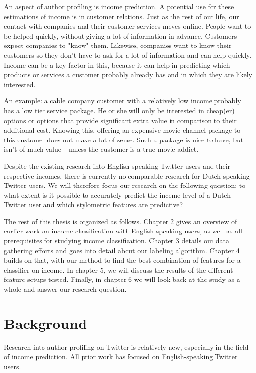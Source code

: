 \documentclass[
10pt, %
a4paper, %
oneside, %
headinclude,footinclude, %
] {book}%
\begin{document}
An aspect of author profiling is income prediction. A potential use for these estimations of income is in customer relations. Just as the rest of our life, our contact with companies and their customer services moves online. People want to be helped quickly, without giving a lot of information in advance. Customers expect companies to "know" them. Likewise, companies want to know their customers so they don't have to ask for a lot of information and can help quickly. Income can be a key factor in this, because it can help in predicting which products or services a customer probably already has and in which they are likely interested.

An example: a cable company customer with a relatively low income probably has a low tier service package. He or she will only be interested in cheap(er) options or options that provide significant extra value in comparison to their additional cost. Knowing this, offering an expensive movie channel package to this customer does not make a lot of sense. Such a package is nice to have, but isn't of much value - unless the customer is a true movie addict.


Despite the existing research into English speaking Twitter users and their respective incomes, there is currently no comparable research for Dutch speaking Twitter users. We will therefore focus our research on the following question: to what extent is it possible to accurately predict the income level of a Dutch Twitter user and which stylometric features are predictive?

The rest of this thesis is organized as follows. Chapter 2 gives an overview of earlier work on income classification with English speaking users, as well as all prerequisites for studying income classification. Chapter 3 details our data gathering efforts and goes into detail about our labeling algorithm. Chapter 4 builds on that, with our method to find the best combination of features for a classifier on income. In chapter 5, we will discuss the results of the different feature setups tested. Finally, in chapter 6 we will look back at the study as a whole and answer our research question.

\chapter{Background}
Research into author profiling on Twitter is relatively new, especially in the field of income prediction. All prior work has focused on English-speaking Twitter users.
\end{document}
